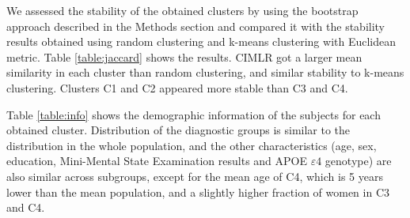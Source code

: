 We assessed the stability of the obtained clusters by using the bootstrap approach described in the Methods section and compared it with the stability results obtained using random clustering and k-means clustering with Euclidean metric. Table \ref{table:jaccard} shows the results. CIMLR got a larger mean similarity in each cluster than random clustering, and similar stability to k-means clustering. Clusters C1 and C2 appeared more stable than C3 and C4. \\

\begin{table}[!htbp]
\centering
{}
\caption[Stability tests.]{Stability tests for the clustering, compared to random clustering and k-means clustering using Euclidean distance. Reported result is mean similarity.}
\label{table:jaccard}
\end{table}

Table \ref{table:info} shows the demographic information of the subjects for each obtained cluster. Distribution of the diagnostic groups is similar to the distribution in the whole population, and the other characteristics (age, sex, education, Mini-Mental State Examination results and APOE $\varepsilon4$ genotype) are also similar across subgroups, except for the mean age of C4, which is 5 years lower than the mean population, and a slightly higher fraction of women in C3 and C4. \\


